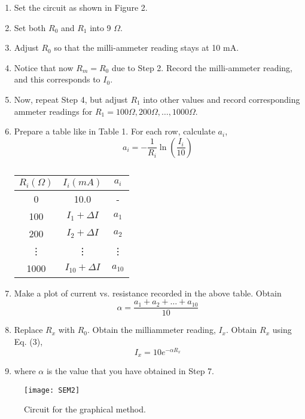 \documentclass[twocolumn,a4paper,11pt]{article}
\begin{document}
\begin{enumerate}
    \item Set the circuit as shown in Figure 2.
    \item Set both \(R_0\) and \(R_1\) into 9 \(\Omega\).
    \item Adjust \(R_0\) so that the milli-ammeter reading stays at 10 mA.
    \item Notice that now \(R_m = R_0\) due to Step 2. Record the milli-ammeter reading, and this corresponds to \(I_0\).
    \item Now, repeat Step 4, but adjust \(R_1\) into other values and record corresponding ammeter readings for \(R_1 = 100\Omega, 200\Omega, \ldots, 1000\Omega\).
    \item Prepare a table like in Table 1. For each row, calculate \(a_i\),
\begin{equation}
a_{i} = -\frac{1}{R_i} \ln \left(\frac{I_i}{10}\right) \tag{8}
\end{equation}
\begin{table}[ht]
\centering
\caption{}
\begin{tabular}{ccc}
\toprule
\(R_i (\Omega)\) & \(I_i (mA)\) & \(a_i\) \\
\midrule
0 & 10.0 & - \\
100 & \(I_1 + \Delta I\) & \(a_1\) \\
200 & \(I_2 + \Delta I\) & \(a_2\) \\
\vdots & \vdots & \vdots \\
1000 & \(I_{10} + \Delta I\) & \(a_{10}\) \\
\bottomrule
\end{tabular}

\label{tab:table1}
\end{table}
   \item Make a plot of current vs. resistance recorded in the above table. Obtain
\begin{equation}
\alpha = \frac{a_1 + a_2 + \ldots + a_{10}}{10} \tag{9}
\end{equation}
    \item Replace \(R_x\) with \(R_0\). Obtain the milliammeter reading, \(I_x\). Obtain \(R_x\) using Eq. (3),
\begin{equation}
I_x = 10e^{-\alpha R_x} \tag{10}
\end{equation}
\item[] where $\alpha$ is the value that you have obtained in Step 7.
\end{enumerate}
\begin{figure}[htbp]
\centering
\texttt{[image: SEM2]}
\caption{Circuit for the graphical method.}
\label{6}
\end{figure}
\newpage
\end{document}
